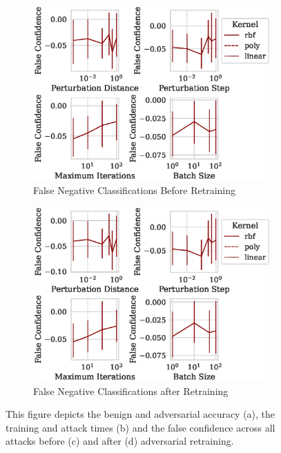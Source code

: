 \documentclass[fonts]{icst}
\begin{document}
\begin{figure}
\begin{subfigure}[b]{0.45\textwidth}
         \label{fig:retrain_time}
     \end{subfigure}
     \hfill
     \begin{subfigure}[b]{0.45\textwidth}
         \centering
         \includegraphics[width=\textwidth]{./generated/confidence_vs_attack_parameters.eps}
         \caption{False Negative Classifications Before Retraining}
        \label{fig:before_retrain}
     \end{subfigure}
     \hfill
     \begin{subfigure}[b]{0.45\textwidth}
         \centering
         \includegraphics[width=\textwidth]{./generated/retrain_confidence_vs_attack_parameters.eps}
         \caption{False Negative Classifications after Retraining}
        \label{fig:after_retrain}
     \end{subfigure}
     \hfill
     \label{fig:retratin}
     \caption{This figure depicts the benign and adversarial accuracy (a), the training and attack times (b) and the false confidence across all attacks before (c) and after (d) adversarial retraining.}
\end{figure}
\end{document}
